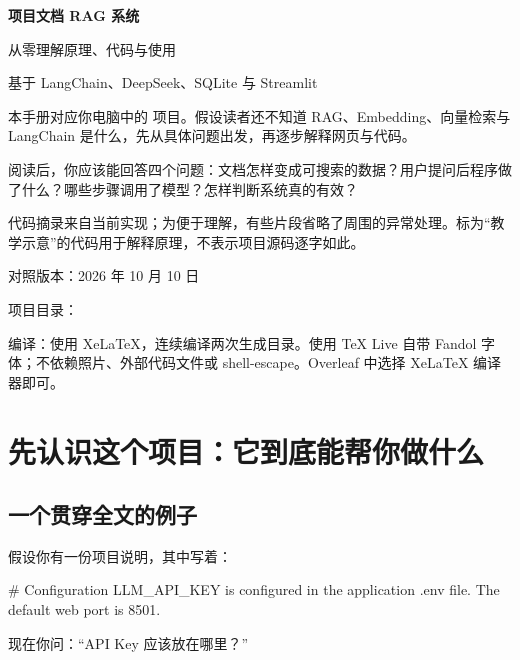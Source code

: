 \documentclass[UTF8,11pt,a4paper,fontset=fandol]{ctexart}
\newcommand{\code}[1]{\texttt{\detokenize{#1}}}
\begin{document}
\begin{titlepage}
\centering
\vspace*{2cm}
{\Huge\bfseries 项目文档 RAG 系统\par}
\vspace{0.6cm}
{\LARGE 从零理解原理、代码与使用\par}
\vspace{1cm}
{\large 基于 LangChain、DeepSeek、SQLite 与 Streamlit\par}
\vspace{1.2cm}
\begin{minipage}{0.9\textwidth}
本手册对应你电脑中的 \code{project-docs-rag} 项目。假设读者还不知道 RAG、Embedding、向量检索与 LangChain 是什么，先从具体问题出发，再逐步解释网页与代码。

阅读后，你应该能回答四个问题：文档怎样变成可搜索的数据？用户提问后程序做了什么？哪些步骤调用了模型？怎样判断系统真的有效？

代码摘录来自当前实现；为便于理解，有些片段省略了周围的异常处理。标为“教学示意”的代码用于解释原理，不表示项目源码逐字如此。
\end{minipage}
\vfill
{\large 对照版本：2026 年 10 月 10 日\par}
\vspace{0.5cm}
\begin{minipage}{0.9\textwidth}
\small
项目目录：

编译：使用 XeLaTeX，连续编译两次生成目录。使用 TeX Live 自带 Fandol 字体；不依赖照片、外部代码文件或 shell-escape。Overleaf 中选择 XeLaTeX 编译器即可。
\end{minipage}
\end{titlepage}

\tableofcontents
\clearpage

\section{先认识这个项目：它到底能帮你做什么}

\subsection{一个贯穿全文的例子}
假设你有一份项目说明，其中写着：
\begin{Code}
# Configuration
LLM_API_KEY is configured in the application .env file.
The default web port is 8501.
\end{Code}
现在你问：“API Key 应该放在哪里？”
\end{document}
